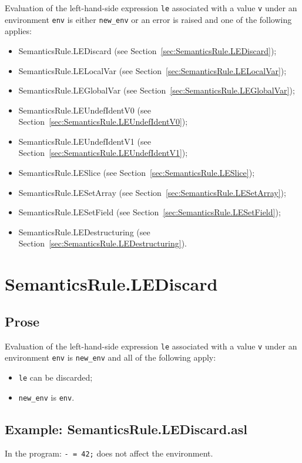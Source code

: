 \documentclass{book}
\begin{document}
Evaluation of the left-hand-side expression \texttt{le} associated with a
value \texttt{v} under an environment \texttt{env} is either \texttt{new\_env}
or an error is raised and one of the following applies:
\begin{itemize}
\item SemanticsRule.LEDiscard (see Section~\ref{sec:SemanticsRule.LEDiscard});
\item SemanticsRule.LELocalVar (see Section~\ref{sec:SemanticsRule.LELocalVar});
\item SemanticsRule.LEGlobalVar (see Section~\ref{sec:SemanticsRule.LEGlobalVar});
\item SemanticsRule.LEUndefIdentV0 (see Section~\ref{sec:SemanticsRule.LEUndefIdentV0});
\item SemanticsRule.LEUndefIdentV1 (see Section~\ref{sec:SemanticsRule.LEUndefIdentV1});
\item SemanticsRule.LESlice (see Section~\ref{sec:SemanticsRule.LESlice});
\item SemanticsRule.LESetArray (see Section~\ref{sec:SemanticsRule.LESetArray});
\item SemanticsRule.LESetField (see Section~\ref{sec:SemanticsRule.LESetField});
\item SemanticsRule.LEDestructuring (see Section~\ref{sec:SemanticsRule.LEDestructuring}).
\end{itemize}

\section{SemanticsRule.LEDiscard \label{sec:SemanticsRule.LEDiscard}}

    \subsection{Prose}
    Evaluation of the left-hand-side expression \texttt{le} associated with a
value \texttt{v} under an environment \texttt{env} is \texttt{new\_env} and all
of the following apply:
    \begin{itemize}
    \item \texttt{le} can be discarded;
    \item \texttt{new\_env} is \texttt{env}.
    \end{itemize}

  \subsection{Example: SemanticsRule.LEDiscard.asl}
  In the program:
  \texttt{- = 42;} does not affect the environment.
\end{document}
